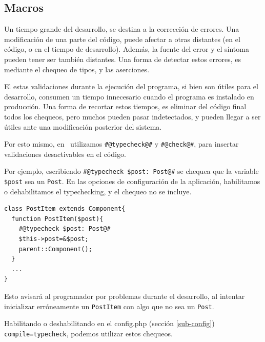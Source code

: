 
\subsection{Macros}
\label{sub-macros}

Un tiempo grande del desarrollo, se destina a la corrección de errores. Una modificación de una parte del código, puede afectar a otras distantes (en el código, o en el tiempo de desarrollo). Además, la fuente del error y el síntoma pueden tener ser también distantes. Una forma de detectar estos errores, es mediante el chequeo de tipos, y las aserciones.

El estas validaciones durante la ejecución del programa, si bien son útiles para el desarrollo, consumen un tiempo innecesario cuando el programa es instalado en producción. Una forma de recortar estos tiempos, es eliminar del código final todos los chequeos, pero muchos pueden pasar indetectados, y pueden llegar a ser útiles ante una modificación posterior del sistema.

Por esto mismo, en \PWB\ utilizamos \verb'#@typecheck@#' y \verb'#@check@#', para insertar validaciones desactivables en el código.

Por ejemplo, escribiendo \verb"#@typecheck $post: Post@#" se chequea que la variable \verb"$post"
sea un \verb'Post'. En las opciones de configuración de la aplicación, habilitamos o dehabilitamos el typechecking, y el chequeo no se incluye.

\begin{verbatim}
class PostItem extends Component{
  function PostItem($post){
    #@typecheck $post: Post@#
    $this->post=&$post;
    parent::Component();
  }
  ...
}
\end{verbatim}

Esto avisará al programador por problemas durante el desarrollo, al intentar inicializar erróneamente un \verb"PostItem" con algo que no sea un \verb'Post'.

Habilitando o deshabilitando en el config.php (sección \ref{sub-config}) \verb'compile=typecheck', podemos utilizar estos chequeos.

